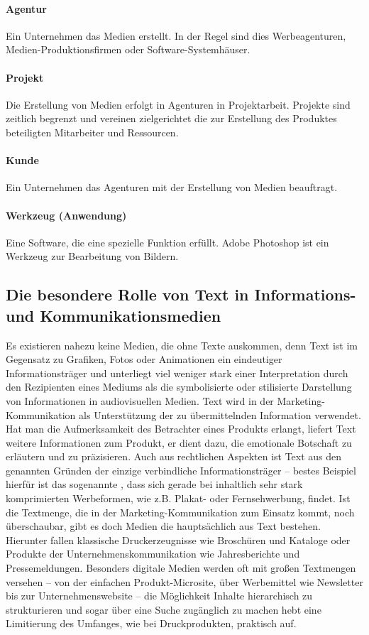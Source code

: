 \paragraph{Agentur} Ein Unternehmen das Medien erstellt. In der Regel sind dies Werbeagenturen, Medien-Produktionsfirmen oder Software-Systemhäuser. 

\paragraph{Projekt} Die Erstellung von Medien erfolgt in Agenturen in Projektarbeit. Projekte sind zeitlich begrenzt und vereinen zielgerichtet die zur Erstellung des Produktes beteiligten Mitarbeiter und Ressourcen. 

\paragraph{Kunde} Ein Unternehmen das Agenturen mit der Erstellung von Medien beauftragt.

\paragraph{Werkzeug (Anwendung)} Eine Software, die eine spezielle Funktion erfüllt. Adobe Photoshop ist ein Werkzeug zur Bearbeitung von Bildern.

\subsection{Die besondere Rolle von Text in Informations- und Kommunikationsmedien}

Es existieren nahezu keine Medien, die ohne Texte auskommen, denn Text ist im Gegensatz zu Grafiken, Fotos oder Animationen ein eindeutiger Informationsträger und unterliegt viel weniger stark einer Interpretation durch den Rezipienten eines Mediums als die symbolisierte oder stilisierte Darstellung von Informationen in audiovisuellen Medien. Text wird in der Marketing-Kommunikation als Unterstützung der zu übermittelnden Information verwendet. Hat man die Aufmerksamkeit des Betrachter eines Produkts erlangt, liefert Text weitere Informationen zum Produkt, er dient dazu, die emotionale Botschaft zu erläutern und zu präzisieren. Auch aus rechtlichen Aspekten ist Text aus den genannten Gründen der einzige verbindliche Informationsträger -- bestes Beispiel hierfür ist das sogenannte , dass sich gerade bei inhaltlich sehr stark komprimierten Werbeformen, wie z.B. Plakat- oder Fernsehwerbung, findet. Ist die Textmenge, die in der Marketing-Kommunikation zum Einsatz kommt, noch überschaubar, gibt es doch Medien die hauptsächlich aus Text bestehen. Hierunter fallen klassische Druckerzeugnisse wie Broschüren und Kataloge oder Produkte der Unternehmenskommunikation wie Jahresberichte und Pressemeldungen. Besonders digitale Medien werden oft mit großen Textmengen versehen -- von der einfachen Produkt-Microsite, über Werbemittel wie Newsletter bis zur Unternehmenswebsite -- die Möglichkeit Inhalte hierarchisch zu strukturieren und sogar über eine Suche zugänglich zu machen hebt eine Limitierung des Umfanges, wie bei Druckprodukten, praktisch auf.

